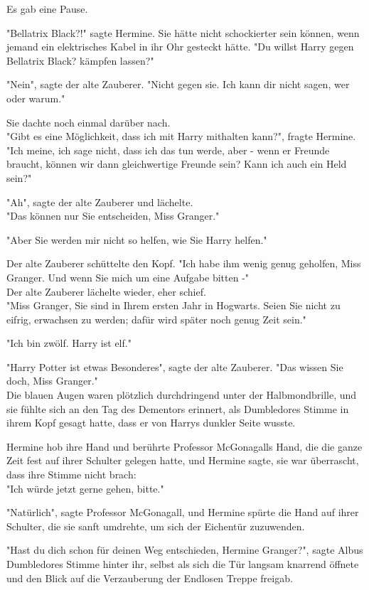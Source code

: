 {Es gab eine Pause.

"Bellatrix Black?!" sagte Hermine. Sie hätte nicht schockierter sein können, wenn jemand ein elektrisches Kabel in ihr Ohr gesteckt hätte. "Du willst Harry gegen Bellatrix Black? kämpfen lassen?"

"Nein", sagte der alte Zauberer. "Nicht gegen sie. Ich kann dir nicht sagen, wer oder warum."

Sie dachte noch einmal darüber nach.\\ "Gibt es eine Möglichkeit, dass ich mit Harry mithalten kann?", fragte Hermine.\\ "Ich meine, ich sage nicht, dass ich das tun werde, aber - wenn er Freunde braucht, können wir dann gleichwertige Freunde sein? Kann ich auch ein Held sein?"

"Ah", sagte der alte Zauberer und lächelte.\\ "Das können nur Sie entscheiden, Miss Granger."

"Aber Sie werden mir nicht so helfen, wie Sie Harry helfen."

Der alte Zauberer schüttelte den Kopf. "Ich habe ihm wenig genug geholfen, Miss Granger. Und wenn Sie mich um eine Aufgabe bitten -"\\ Der alte Zauberer lächelte wieder, eher schief.\\ "Miss Granger, Sie sind in Ihrem ersten Jahr in Hogwarts. Seien Sie nicht zu eifrig, erwachsen zu werden; dafür wird später noch genug Zeit sein."

"Ich bin zwölf. Harry ist elf."

"Harry Potter ist etwas Besonderes", sagte der alte Zauberer. "Das wissen Sie doch, Miss Granger."\\ Die blauen Augen waren plötzlich durchdringend unter der Halbmondbrille, und sie fühlte sich an den Tag des Dementors erinnert, als Dumbledores Stimme in ihrem Kopf gesagt hatte, dass er von Harrys dunkler Seite wusste.

Hermine hob ihre Hand und berührte Professor McGonagalls Hand, die die ganze Zeit fest auf ihrer Schulter gelegen hatte, und Hermine sagte, sie war überrascht, dass ihre Stimme nicht brach:\\ "Ich würde jetzt gerne gehen, bitte."

"Natürlich", sagte Professor McGonagall, und Hermine spürte die Hand auf ihrer Schulter, die sie sanft umdrehte, um sich der Eichentür zuzuwenden.

"Hast du dich schon für deinen Weg entschieden, Hermine Granger?", sagte Albus Dumbledores Stimme hinter ihr, selbst als sich die Tür langsam knarrend öffnete und den Blick auf die Verzauberung der Endlosen Treppe freigab.

}
